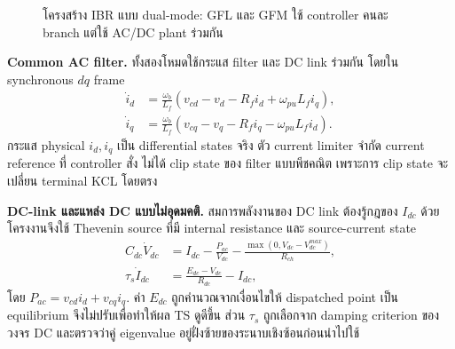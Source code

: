 \documentclass[12pt,a4paper]{article}
\begin{document}
\begin{figure}[H]
\centering
{}
\caption{โครงสร้าง IBR แบบ dual-mode: GFL และ GFM ใช้ controller คนละ branch แต่ใช้ AC/DC plant ร่วมกัน}
\label{fig:dualibr}
\end{figure}

\noindent\textbf{Common AC filter.} ทั้งสองโหมดใช้กระแส filter และ DC link ร่วมกัน โดยใน synchronous $dq$ frame
\begin{align}
\dot i_d&=\frac{\omega_b}{L_f}\left(v_{cd}-v_d-R_fi_d+\omega_{pu}L_fi_q\right),\\
\dot i_q&=\frac{\omega_b}{L_f}\left(v_{cq}-v_q-R_fi_q-\omega_{pu}L_fi_d\right).
\label{eq:filter_dq}
\end{align}
กระแส physical $i_d,i_q$ เป็น differential states จริง ตัว current limiter จำกัด current reference ที่ controller สั่ง ไม่ได้ clip state ของ filter แบบพีชคณิต เพราะการ clip state จะเปลี่ยน terminal KCL โดยตรง

\noindent\textbf{DC-link และแหล่ง DC แบบไม่อุดมคติ.} สมการพลังงานของ DC link ต้องรู้กฎของ $I_{dc}$ ด้วย โครงงานจึงใช้ Thevenin source ที่มี internal resistance และ source-current state
\begin{align}
C_{dc}\dot V_{dc}&=I_{dc}-\frac{P_{ac}}{V_{dc}}-\frac{\max(0,V_{dc}-V_{dc}^{max})}{R_{ch}},\\
\tau_s\dot I_{dc}&=\frac{E_{dc}-V_{dc}}{R_{dc}}-I_{dc},
\label{eq:dc_summary}
\end{align}
โดย $P_{ac}=v_{cd}i_d+v_{cq}i_q$. ค่า $E_{dc}$ ถูกคำนวณจากเงื่อนไขให้ dispatched point เป็น equilibrium จึงไม่ปรับเพื่อทำให้ผล TS ดูดีขึ้น ส่วน $\tau_s$ ถูกเลือกจาก damping criterion ของวงจร DC และตรวจว่าคู่ eigenvalue อยู่ฝั่งซ้ายของระนาบเชิงซ้อนก่อนนำไปใช้
\end{document}
